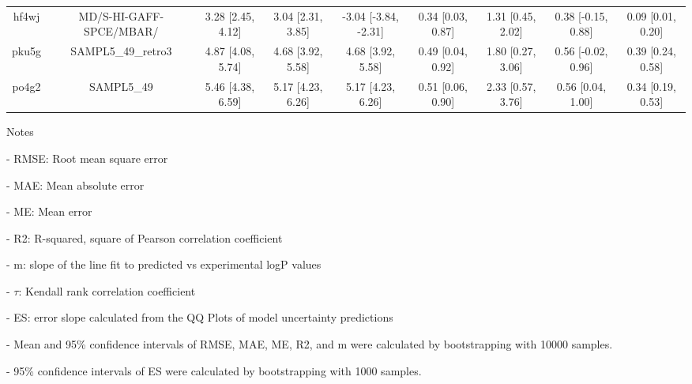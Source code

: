 \documentclass{article}
\begin{document}
\begin{center}
\begin{longtable}{|ccccccccc|}
 hf4wj &                            MD/S-HI-GAFF-SPCE/MBAR/ &  3.28 [2.45, 4.12] &  3.04 [2.31, 3.85] &  -3.04 [-3.84, -2.31] &  0.34 [0.03, 0.87] &    1.31 [0.45, 2.02] &   0.38 [-0.15, 0.88] &     0.09 [0.01, 0.20] \\
 pku5g &                                 SAMPL5\_49\_retro3 &  4.87 [4.08, 5.74] &  4.68 [3.92, 5.58] &     4.68 [3.92, 5.58] &  0.49 [0.04, 0.92] &    1.80 [0.27, 3.06] &   0.56 [-0.02, 0.96] &     0.39 [0.24, 0.58] \\
 po4g2 &                                         SAMPL5\_49 &  5.46 [4.38, 6.59] &  5.17 [4.23, 6.26] &     5.17 [4.23, 6.26] &  0.51 [0.06, 0.90] &    2.33 [0.57, 3.76] &    0.56 [0.04, 1.00] &     0.34 [0.19, 0.53] \\
\end{longtable}
\end{center}

Notes

- RMSE: Root mean square error

- MAE: Mean absolute error

- ME: Mean error

- R2: R-squared, square of Pearson correlation coefficient

- m: slope of the line fit to predicted vs experimental logP values

- $\tau$:  Kendall rank correlation coefficient

- ES: error slope calculated from the QQ Plots of model uncertainty predictions

- Mean and 95\% confidence intervals of RMSE, MAE, ME, R2, and m were calculated by bootstrapping with 10000 samples.

- 95\% confidence intervals of ES were calculated by bootstrapping with 1000 samples.\end{document}
\end{document}
